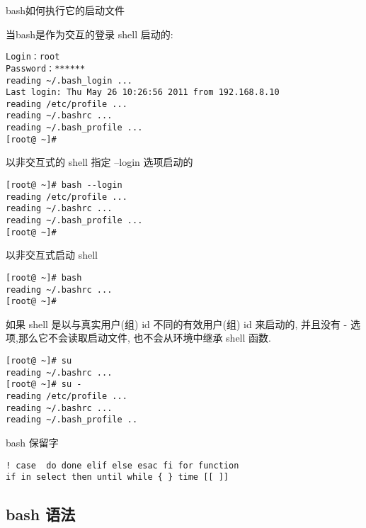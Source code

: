 \begin{frame}{bash如何执行它的启动文件}
\begin{block}{当bash是作为交互的登录 shell 启动的:}
\begin{verbatim} 
Login：root
Password：******
reading ~/.bash_login ... 
Last login: Thu May 26 10:26:56 2011 from 192.168.8.10
reading /etc/profile ... 
reading ~/.bashrc ... 
reading ~/.bash_profile ... 
[root@ ~]# 
\end{verbatim}
\end{block}

\begin{block}{以非交互式的 shell 指定 --login 选项启动的}
\begin{verbatim}
[root@ ~]# bash --login
reading /etc/profile ... 
reading ~/.bashrc ... 
reading ~/.bash_profile ... 
[root@ ~]# 
\end{verbatim}
\end{block}

\newpage

\begin{block}{以非交互式启动 shell }
\begin{verbatim}
[root@ ~]# bash
reading ~/.bashrc ... 
[root@ ~]# 
\end{verbatim}
\end{block}

\newpage

\begin{block}{如果 shell 是以与真实用户(组) id 不同的有效用户(组) id 来启动的, 并且没有 - 选项,那么它不会读取启动文件, 也不会从环境中继承 shell 函数. }
\begin{verbatim}
[root@ ~]# su 
reading ~/.bashrc ... 
[root@ ~]# su -
reading /etc/profile ... 
reading ~/.bashrc ... 
reading ~/.bash_profile ..
\end{verbatim}
\end{block}
\end{frame}

\begin{frame}{bash 保留字}
\begin{verbatim}
! case  do done elif else esac fi for function  
if in select then until while { } time [[ ]]
\end{verbatim}
\end{frame}

\subsection{bash 语法}

